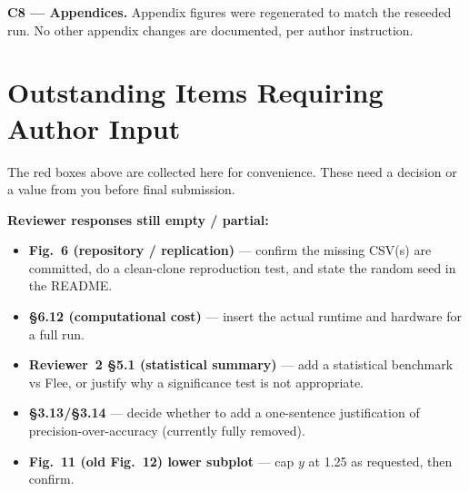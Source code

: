 \documentclass[11pt,a4paper]{article}
\begin{document}
\begin{authorbox}
\textbf{C8 --- Appendices.} Appendix figures were regenerated to match the reseeded run. No other appendix changes
are documented, per author instruction.
\end{authorbox}

\newpage
\section*{Outstanding Items Requiring Author Input}
\label{sec:open}

The red boxes above are collected here for convenience. These need a decision or a value from you before final
submission.

\begin{flagbox}
\textbf{Reviewer responses still empty / partial:}
\begin{itemize}
  \item \textbf{Fig.~6 (repository / replication)} --- confirm the missing CSV(s) are committed, do a clean-clone
        reproduction test, and state the random seed in the README.
  \item \textbf{§6.12 (computational cost)} --- insert the actual runtime and hardware for a full run.
  \item \textbf{Reviewer~2 §5.1 (statistical summary)} --- add a statistical benchmark vs Flee, or justify why a
        significance test is not appropriate.
  \item \textbf{§3.13/§3.14} --- decide whether to add a one-sentence justification of precision-over-accuracy
        (currently fully removed).
  \item \textbf{Fig.~11 (old Fig.~12) lower subplot} --- cap $y$ at 1.25 as requested, then confirm.
\end{itemize}
\end{flagbox}
\end{document}
